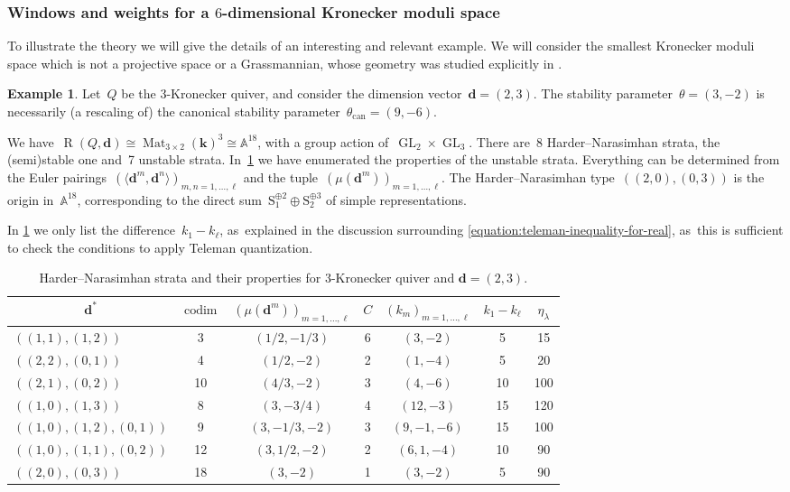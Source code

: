 \documentclass[11pt]{article}
\theoremstyle{plain}
\theoremstyle{definition}
\newtheorem{example}[theorem]{Example}
\DeclareMathOperator\GL{GL}
\DeclareMathOperator\Mat{Mat}
\DeclareMathOperator\Rep{R}
\newcommand\can{\ensuremath{\mathrm{can}}}
\newcommand\field{\mathbf{k}}
\newcommand\tuple[1]{\ensuremath{{\boldsymbol{#1}}}}
\begin{document}
\subsubsection*{Windows and weights for a $6$-dimensional Kronecker moduli space}
To illustrate the theory we will give the details of an interesting and relevant example.
We will consider the smallest Kronecker moduli space which is not a projective space or a Grassmannian,
whose geometry was studied explicitly in \cite{MR4770368}.
\begin{example}
\label{example:kronecker-moduli-space}
Let~$Q$ be the $3$-Kronecker quiver,
and consider the dimension vector~$\tuple{d}=(2,3)$.
The stability parameter~$\theta=(3,-2)$ is necessarily
(a rescaling of) the canonical stability parameter~$\theta_\can=(9,-6)$.
\end{example}
We have~$\Rep(Q,\tuple{d})\cong\Mat_{3\times 2}(\field)^3\cong\mathbb{A}^{18}$,
with a group action of~$\GL_2\times\GL_3$.
There are~8 Harder--Nara\-sim\-han strata,
the (semi)stable one and~7 unstable strata. In~\cref{table:harder-narasimhan-strata} we have enumerated the properties of the unstable strata.
Everything can be determined from the Euler pairings~$(\langle\tuple{d}^m,\tuple{d}^n\rangle)_{m,n=1,\ldots,\ell}$
and the tuple~$(\mu(\tuple{d}^m))_{m=1,\ldots,\ell}$.
The Harder--Narasimhan type~$((2,0),(0,3))$ is the origin in~$\mathbb{A}^{18}$,
corresponding to the direct sum~$\mathrm{S}_1^{\oplus2}\oplus\mathrm{S}_2^{\oplus3}$ of simple representations.

In \cref{table:harder-narasimhan-strata} we only list the difference~$k_1-k_\ell$, as~explained in the discussion surrounding \eqref{equation:teleman-inequality-for-real}, as~this is sufficient to check the conditions to apply Teleman quantization.

\begin{table}
\centering
\caption{Harder--Narasimhan strata and their properties for 3\protect\nobreakdash-Kro\-necker quiver and $\tuple{d}=(2,3)$.}
\label{table:harder-narasimhan-strata}
\begin{tabular}{lcccccc}
\toprule
\multicolumn{1}{c}{$\tuple{d}^*$} & $\operatorname{codim}$ & $(\mu(\tuple{d}^m))_{m=1,\ldots,\ell}$ & $C$ & $(k_m)_{m=1,\ldots,\ell}$ & $k_1-k_\ell$ & $\eta_\lambda$ \\
\midrule
$((1,1),(1,2))$ & 3 & $(1/2,-1/3)$ & 6 & $(3,-2)$ & 5 & 15 \\
$((2,2),(0,1))$ & 4 & $(1/2,-2)$ & 2 & $(1,-4)$ & 5 & 20 \\
$((2,1),(0,2))$ & 10 & $(4/3,-2)$ & 3 & $(4,-6)$ & 10 & 100 \\
$((1,0),(1,3))$ & 8 & $(3,-3/4)$ & 4 & $(12,-3)$ & 15 & 120 \\
$((1,0),(1,2),(0,1))$ & 9 & $(3,-1/3,-2)$ & 3 & $(9,-1,-6)$ & 15 & 100 \\
$((1,0),(1,1),(0,2))$ & 12 & $(3,1/2,-2)$ & 2 & $(6,1,-4)$ & 10 & 90 \\
$((2,0),(0,3))$ & 18 & $(3,-2)$ & 1 & $(3,-2)$ & 5 & 90 \\
\bottomrule
\end{tabular}
\end{table}
\end{document}
